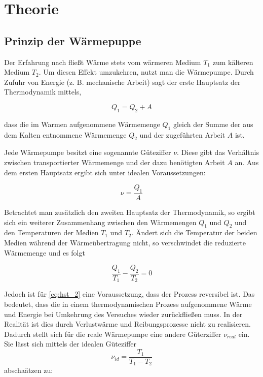 \section{Theorie}

\subsection{Prinzip der Wärmepuppe}

Der Erfahrung nach fließt Wärme stets
vom wärmeren Medium $T_1$ zum kälteren Medium $T_2$.
Um diesen Effekt umzukehren, nutzt man die Wärmepumpe.
Durch Zufuhr von Energie (z. B. mechanische Arbeit) sagt der erste
Hauptsatz der Thermodynamik mittels,

\begin{equation}
\label{eq:hst_1}
Q_1=Q_2+A
\end{equation}

dass die im Warmen aufgenommene Wärmemenge $Q_1$ gleich
der Summe der aus dem Kalten entnommene Wärmemenge $Q_2$
und der zugeführten Arbeit $A$ ist.

Jede Wärmepumpe besitzt eine sogenannte Güteziffer $\nu$.
Diese gibt das Verhältnis zwischen transportierter Wärmemenge
und der dazu benötigten Arbeit $A$ an.
Aus dem ersten Hauptsatz ergibt sich unter idealen Voraussetzungen:

\begin{equation}
\label{eq:best_kennziffer}
\nu=\frac{Q_1}{A}
\end{equation}

Betrachtet man zusätzlich den zweiten Hauptsatz der Thermodynamik, so
ergibt sich ein weiterer Zusammenhang zwischen den Wärmemengen
$Q_1$ und $Q_2$ und den Temperaturen der Medien $T_1$ und $T_2$.
Ändert sich die Temperatur der beiden Medien während der
Wärmeübertragung nicht, so verschwindet die reduzierte Wärmemenge und es folgt

\begin{equation}
\label{eq:hst_2}
\frac{Q_1}{T_1}-\frac{Q_2}{T_2}=0
\end{equation}

Jedoch ist für \eqref{eq:hst_2} eine Voraussetzung,
dass der Prozess reversibel ist.
Das bedeutet, dass die in einem thermodynamischen Prozess aufgenommene Wärme
und Energie bei Umkehrung des Versuches wieder zurückfließen muss.
In der Realität ist dies durch Verlustwärme und Reibungsprozesse
nicht zu realisieren.
Dadurch stellt sich für die reale Wärmepumpe eine andere
Güterziffer $\nu_{real}$ ein.
Sie lässt sich mittels der idealen Güteziffer
\begin{equation*}
\nu_{id}=\frac{T_1}{T_1-T_2}
\end{equation*}
abschaätzen zu:

